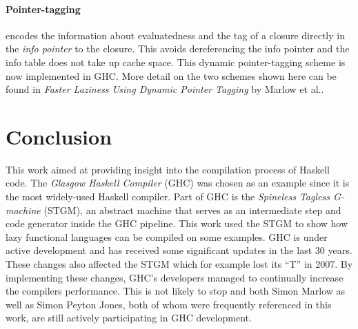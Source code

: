 \documentclass[runningheads]{llncs}
\begin{document}
\paragraph{Pointer-tagging} encodes the information about evaluatedness and the tag of a closure directly in the \textit{info pointer} to the closure. This avoids dereferencing the info pointer and the info table does not take up cache space. This dynamic pointer-tagging scheme is now implemented in GHC. More detail on the two schemes shown here can be found in \textit{Faster Laziness Using Dynamic Pointer Tagging} by Marlow et al.\cite{marlow2007faster}.


\section{Conclusion}
\label{sec:conclusion}

This work aimed at providing insight into the compilation process of Haskell code. The \textit{Glasgow Haskell Compiler} (GHC) was chosen as an example since it is the most widely-used Haskell compiler. Part of GHC is the \textit{Spineless Tagless G-machine} (STGM), an abstract machine that serves as an intermediate step and code generator inside the GHC pipeline. This work used the STGM to show how lazy functional languages can be compiled on some examples. GHC is under active development and has received some significant updates in the last 30 years. These changes also affected the STGM which for example lost its \enquote{T} in 2007. By implementing these changes, GHC's developers managed to continually increase the compilers performance. This is not likely to stop and both Simon Marlow as well as Simon Peyton Jones, both of whom were frequently referenced in this work, are still actively participating in GHC development.


%
%
\newpage



\appendix
\end{document}
